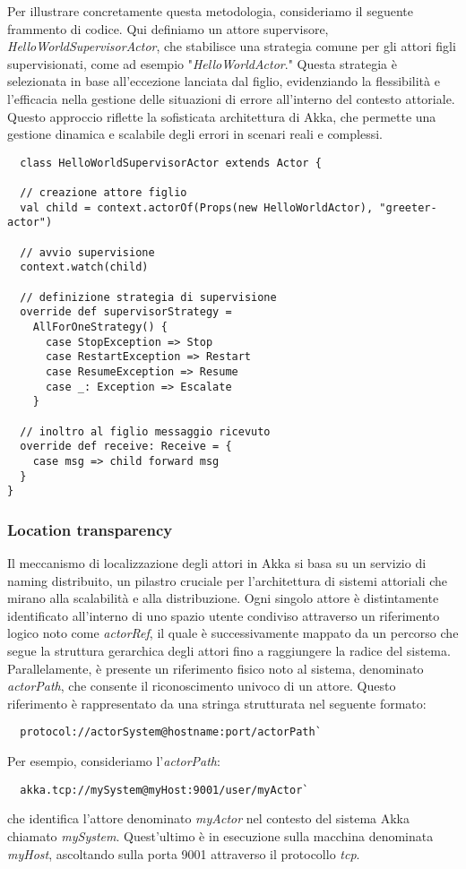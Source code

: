 Per illustrare concretamente questa metodologia, consideriamo il seguente frammento di codice.
Qui definiamo un attore supervisore, \textit{HelloWorldSupervisorActor}, che stabilisce una strategia comune per gli attori figli supervisionati, come ad esempio "\textit{HelloWorldActor}."
Questa strategia è selezionata in base all'eccezione lanciata dal figlio, evidenziando la flessibilità e l'efficacia nella gestione delle situazioni di errore all'interno del contesto attoriale.
Questo approccio riflette la sofisticata architettura di Akka, che permette una gestione dinamica e scalabile degli errori in scenari reali e complessi.

\begin{lstlisting}
  class HelloWorldSupervisorActor extends Actor {

  // creazione attore figlio
  val child = context.actorOf(Props(new HelloWorldActor), "greeter-actor")

  // avvio supervisione
  context.watch(child)
  
  // definizione strategia di supervisione
  override def supervisorStrategy =
    AllForOneStrategy() {
      case StopException => Stop
      case RestartException => Restart
      case ResumeException => Resume
      case _: Exception => Escalate
    }
  
  // inoltro al figlio messaggio ricevuto
  override def receive: Receive = {
    case msg => child forward msg
  }
}

\end{lstlisting}

\subsubsection[Location transparency]{Location transparency}
Il meccanismo di localizzazione degli attori in Akka si basa su un servizio di naming distribuito, un pilastro cruciale per l'architettura di sistemi attoriali che mirano alla scalabilità e alla distribuzione.
Ogni singolo attore è distintamente identificato all'interno di uno spazio utente condiviso attraverso un riferimento logico noto come \textit{actorRef}, il quale è successivamente mappato da un percorso che segue la struttura gerarchica degli attori fino a raggiungere la radice del sistema. \\
Parallelamente, è presente un riferimento fisico noto al sistema, denominato \textit{actorPath}, che consente il riconoscimento univoco di un attore.
Questo riferimento è rappresentato da una stringa strutturata nel seguente formato:
\begin{lstlisting}
  protocol://actorSystem@hostname:port/actorPath`  
\end{lstlisting}
Per esempio, consideriamo l'\textit{actorPath}:
\begin{lstlisting}
  akka.tcp://mySystem@myHost:9001/user/myActor`
\end{lstlisting}
che identifica l'attore denominato \textit{myActor} nel contesto del sistema Akka chiamato \textit{mySystem}.
Quest'ultimo è in esecuzione sulla macchina denominata \textit{myHost}, ascoltando sulla porta 9001 attraverso il protocollo \textit{tcp}. 

